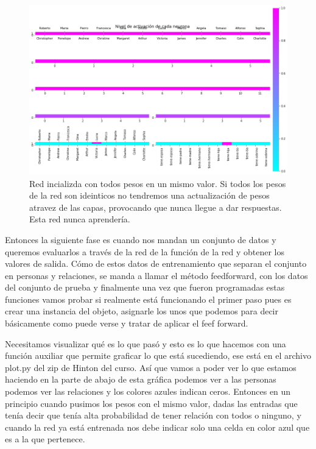 {  \begin{figure}[H]
   \centering
   \includegraphics[scale=.5]{../Figuras/Hinton/r1.png}
   \caption{Red incializda con todos pesos en un mismo valor. Si todos los pesos de la red son ideinticos no tendremos una actualización de pesos atravez de las capas, provocando que nunca llegue a dar respuestas. Esta red nunca aprendería.}
  \label{fig:r1}
  \end{figure}


Entonces la siguiente fase es cuando nos mandan un conjunto de datos y queremos evaluarlos a través de la red de la función de la red y obtener los valores de salida. Cómo de estos datos de entrenamiento que separan el conjunto en personas y relaciones, se manda a llamar el método feedforward, con los datos del conjunto de prueba y finalmente  una vez que fueron programadas estas funciones vamos probar si realmente está funcionando el primer paso pues es crear una instancia del objeto, asignarle los unos que podemos para decir básicamente como puede verse y tratar de aplicar el feef forward. 

 Necesitamos visualizar qué es lo que pasó y esto es lo que hacemos con una función auxiliar que permite graficar lo que está sucediendo, ese está en el archivo plot.py del zip de Hinton del curso. Así que vamos a poder ver lo que estamos haciendo en la parte de abajo de esta gráfica  podemos ver a las personas podemos ver las relaciones y los colores azules indican ceros. Entonces en un principio cuando pusimos los pesos con el mismo valor, dadas las entradas que tenía decir que tenía alta probabilidad de tener relación con todos o ninguno, y cuando la red ya está entrenada nos debe indicar solo una celda en color azul que es a la que pertenece.
 
}
